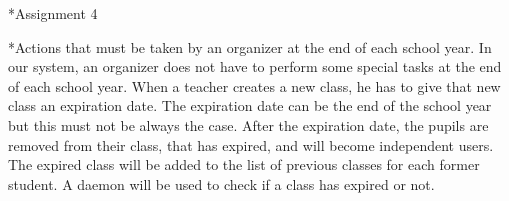 \begin{section}*{Assignment 4}

    \begin{subsection}*{Actions that must be taken by an organizer at the end of each school year.}
    	In our system, an organizer does not have to perform some special tasks at the end of each school year. When a teacher creates a new class, he has to give that new class an expiration date. The expiration date can be the end of the school year but this must not be always the case. After the expiration date, the pupils are removed from their class, that has expired, and will become independent users. The expired class will be added to the list of previous classes for each former student. A daemon will be used to check if a class has expired or not. 
    \end{subsection}
    
\end{section}